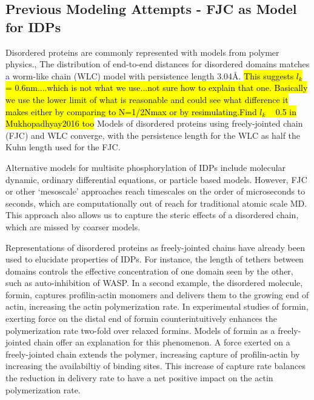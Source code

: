 \documentclass[../AdvancementSummary.tex]{subfiles}
\begin{document}
\subsection{Previous Modeling Attempts - FJC as Model for IDPs}

Disordered proteins are commonly represented with models from polymer physics.\cite{VanValen2009},\cite{Reeves2011} The distribution of end-to-end distances for disordered domains matches a worm-like chain (WLC) model with persistence length 3.04\AA . \cite{Zhou2001} \hl{This suggests $l_k$ = 0.6nm....which is not what we use...not sure how to explain that one. Basically we use the lower limit of what is reasonable and could see what difference it makes either by comparing to N=1/2Nmax or by resimulating.}\hl{Find $l_k$ ~ 0.5 in Mukhopadhyay2016 too} Models of disordered proteins using freely-jointed chain (FJC) and WLC converge, with the persistence length for the WLC as half the Kuhn length used for the FJC. \cite{VanValen2009}

Alternative models for multisite phosphorylation of IDPs include molecular dynamic, ordinary differential equations, or particle based models. However, FJC or other `mesoscale' approaches reach timescales on the order of microseconds to seconds, which are computationally out of reach for traditional atomic scale MD. This approach also allows us to capture the steric effects of a disordered chain, which are missed by coarser models. 

Representations of disordered proteins as freely-jointed chains have already been used to elucidate properties of IDPs. For instance, the length of tethers between domains controls the effective concentration of one domain seen by the other, such as auto-inhibition of WASP. \cite{VanValen2009} In a second example, the disordered molecule, formin, captures profilin-actin monomers and delivers them to the growing end of actin, increasing the actin polymerization rate. In experimental studies of formin, exerting force on the distal end of formin counterintuitively enhances the polymerization rate two-fold over relaxed formins. \cite{Jegou2013} Models of formin as a freely-jointed chain offer an explanation for this phenomenon. A force exerted on a freely-jointed chain extends the polymer, increasing capture of profilin-actin by increasing the availabiltiy of binding sites. This increase of capture rate balances the reduction in delivery rate to have a net positive impact on the actin polymerization rate. \cite{Bryant2017}
\end{document}
